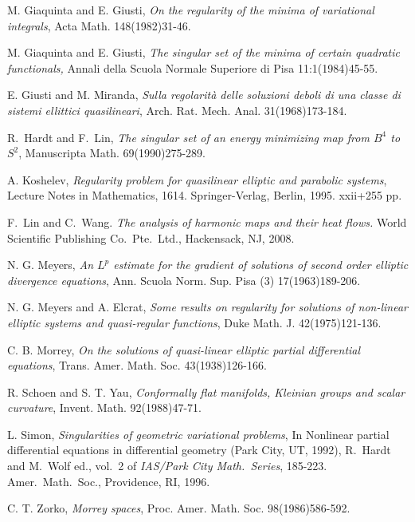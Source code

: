 \documentclass[12pt]{amsart}
\begin{document}
\begin{thebibliography}{99}
 M. Giaquinta and E. Giusti, {\it On the regularity of the minima of variational integrals}, {Acta Math.} 148(1982)31-46.

 M. Giaquinta and E. Giusti, {\it The singular set of the minima of certain quadratic functionals,} {Annali della Scuola Normale Superiore di Pisa} 11:1(1984)45-55.

 E. Giusti and M. Miranda, {\it Sulla regolarit\`a delle soluzioni deboli di una classe di sistemi ellittici quasilineari}, Arch. Rat. Mech. Anal. 31(1968)173-184.

 R.~Hardt and F.~Lin,
{\it The singular set of an energy minimizing map from $B^4$ to $S^2$},
{Manuscripta Math.} 69(1990)275-289.

 A. Koshelev, {\it Regularity problem for quasilinear elliptic and parabolic systems}, Lecture Notes in Mathematics, 1614. Springer-Verlag, Berlin, 1995. xxii+255 pp.

 F.~Lin and C.~Wang.
\emph{The analysis of harmonic maps and their heat flows.}
World Scientific Publishing Co.~Pte.~Ltd., Hackensack, NJ, 2008.

 N. G. Meyers, {\it An {$L^{p}$} estimate for the gradient of
solutions of second order elliptic divergence equations}, {Ann.
Scuola Norm. Sup. Pisa (3)} 17(1963)189-206.

 N. G. Meyers and A. Elcrat, {\it Some results on regularity for
solutions of non-linear elliptic systems and quasi-regular
functions}, {Duke Math. J.} 42(1975)121-136.

 C. B. Morrey, {\it On the solutions of quasi-linear elliptic partial differential equations}, Trans. Amer. Math. Soc. 43(1938)126-166.

 R. Schoen and S. T. Yau, {\it Conformally flat manifolds, Kleinian groups and scalar curvature}, Invent. Math. 92(1988)47-71.

 L. Simon, {\it Singularities of geometric variational problems},
In {Nonlinear partial differential equations in differential geometry (Park City, UT, 1992)}, R.~Hardt and M.~Wolf ed., vol.~2 of \emph{IAS/Park City Math.~Series}, 185-223.  Amer.~Math.~Soc., Providence, RI, 1996.

 C. T. Zorko, {\it Morrey spaces}, {Proc. Amer. Math. Soc.} 98(1986)586-592.

\end{thebibliography}
\end{document}
